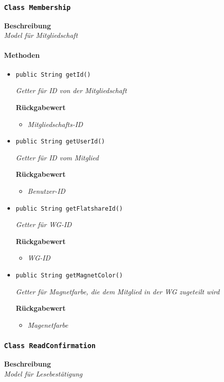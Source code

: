      \subsubsection{\texttt{Class Membership}}
     \textbf{Beschreibung} \\
     \textit{Model für Mitgliedschaft}
     \paragraph*{Methoden}
     \begin{itemize}
     	\item{\texttt{public String getId()}}
     	
     	\textit{Getter für ID von der Mitgliedschaft}
     	
     	\textbf{Rückgabewert}
     	\begin{itemize}
     		\item\textit{Mitgliedschafts-ID}
     	\end{itemize}
     
     \item{\texttt{public String getUserId()}}
     	
     	\textit{Getter für ID vom Mitglied}
     	
     	\textbf{Rückgabewert}
     	\begin{itemize}
     		\item\textit{Benutzer-ID}
     	\end{itemize}
     
     \item{\texttt{public String getFlatshareId()}}
     	
     	\textit{Getter für WG-ID}
     	
     	\textbf{Rückgabewert}
     	\begin{itemize}
     		\item\textit{WG-ID}
     	\end{itemize}
     
     \item{\texttt{public String getMagnetColor()}}
     	
     	\textit{Getter für Magnetfarbe, die dem Mitglied in der WG zugeteilt wird}
     	
     	\textbf{Rückgabewert} 
     	\begin{itemize}
     		\item\textit{Magenetfarbe}
     	\end{itemize}
     \end{itemize}
     \subsubsection{\texttt{Class ReadConfirmation}}
     \textbf{Beschreibung} \\
     \textit{Model für Lesebestätigung}
